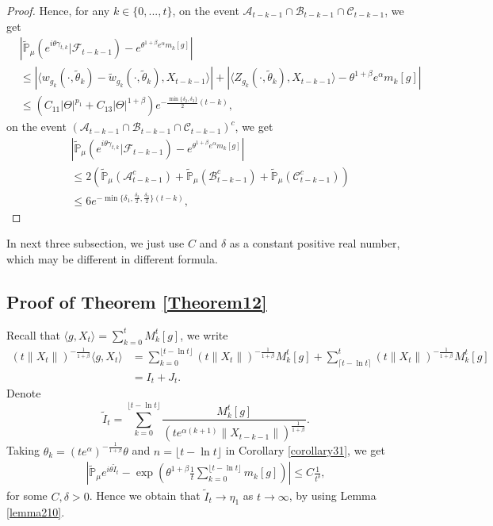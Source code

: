 \documentclass[12pt, a4paper]{amsart}
\theoremstyle{definition}
\numberwithin{equation}{section}
\begin{document}
\begin{proof}
Hence, for any $k\in\{0,...,t\}$, on the event $\mathcal{A}_{t-k-1}\cap\mathcal{B}_{t-k-1}\cap\mathcal{C}_{t-k-1}$, we get
\begin{align*}
   &\left|\mathbb{\tilde{P}}_{\mu}\left(e^{i\theta \gamma_{t,k}}|\mathcal{F}_{t-k-1}\right)-e^{\theta^{1+\beta}e^{\alpha}m_k[g]}\right|\\
   &\leq \left|\langle w_{g_k}(\cdot,\tilde{\theta}_k)-\tilde{w}_{g_k}(\cdot,\tilde{\theta}_k), X_{t-k-1}\rangle\right|
   +\left|\langle Z_{g_k}(\cdot,\tilde{\theta}_k),X_{t-k-1}\rangle-\theta^{1+\beta}e^{\alpha}m_k[g]\right|\\
   &\leq (C_{11}|\Theta|^{p_1}+C_{13}|\Theta|^{1+\beta}) e^{-\frac{\min\{\delta_2,\delta_3\}}{2}(t-k)},
\end{align*}
on the event $(\mathcal{A}_{t-k-1}\cap\mathcal{B}_{t-k-1}\cap\mathcal{C}_{t-k-1})^c$, we get
\begin{align*}
    &\left|\mathbb{\tilde{P}}_{\mu}\left(e^{i\theta \gamma_{t,k}}|\mathcal{F}_{t-k-1}\right)-e^{\theta^{1+\beta}e^{\alpha}m_k[g]}\right|\\
    &\leq 2(\mathbb{\tilde{P}}_{\mu}(\mathcal{A}^c_{t-k-1})+\mathbb{\tilde{P}}_{\mu}(\mathcal{B}^c_{t-k-1})+\mathbb{\tilde{P}}_{\mu}(\mathcal{C}^c_{t-k-1}))\\
    &\leq 6e^{-\min\{\delta_1,\frac{\delta_2}{2},\frac{\delta_3}{2}\}(t-k)},
\end{align*}
\end{proof}


In next three subsection, we just use $C$ and $\delta$ as a constant positive real number, which may be different in different formula.
\subsection{Proof of Theorem \ref{Theorem12}}

    Recall that $\langle g,X_t\rangle=\sum_{k=0}^t M_k^t[g]$, we write
    \begin{align*}
        (t\|X_t\|)^{-\frac{1}{1+\beta}}\langle g,X_t\rangle&=\sum_{k=0}^{\lfloor t-\ln t \rfloor} (t\|X_t\|)^{-\frac{1}{1+\beta}}M_k^t[g]+\sum_{\lceil t-\ln t \rceil}^t (t\|X_t\|)^{-\frac{1}{1+\beta}}M_k^t[g]\\
        &=I_t+J_t.
    \end{align*}
    Denote
    $$\tilde{I}_t=\sum_{k=0}^{\lfloor t-\ln t \rfloor}\frac{M_k^t[g]}{(t e^{\alpha(k+1)}\|X_{t-k-1}\|)^{\frac{1}{1+\beta}}}.$$
    Taking $\theta_k=(t e^{\alpha})^{-\frac{1}{1+\beta}} \theta $ and $n={\lfloor t-\ln t \rfloor}$ in Corollary \ref{corollary31}, we get
    \begin{align*}
        \left|\mathbb{\tilde{P}}_{\mu}e^{i\theta\tilde{I}_t}-\exp\left(\theta^{1+\beta}\frac{1}{t}\sum_{k=0}^{\lfloor t-\ln t \rfloor}m_k[g]\right)\right|\leq C \frac{1}{t^{\delta}},
    \end{align*}
    for some $C,\delta>0$. Hence we obtain that $\tilde{I}_t\rightarrow\eta_1$ as $t\rightarrow \infty$, by using Lemma \ref{lemma210}.
\end{document}
